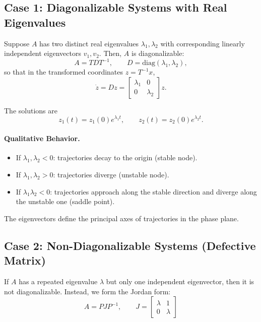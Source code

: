 \subsection{Case 1: Diagonalizable Systems with Real Eigenvalues}

Suppose $A$ has two distinct real eigenvalues $\lambda_1, \lambda_2$ with corresponding linearly independent eigenvectors $v_1, v_2$.  
Then, $A$ is diagonalizable:
\begin{equation}
\boxed{A = T D T^{-1}, \qquad D = \text{diag}(\lambda_1,\lambda_2),}
\end{equation}
so that in the transformed coordinates $z = T^{-1}x$,
\begin{equation}
\dot{z} = Dz =
\begin{bmatrix}
\lambda_1 & 0 \\
0 & \lambda_2
\end{bmatrix} z.
\end{equation}

The solutions are
\begin{equation}
z_1(t) = z_1(0)e^{\lambda_1 t}, \qquad z_2(t) = z_2(0)e^{\lambda_2 t}.
\end{equation}

\paragraph{Qualitative Behavior.}
\begin{itemize}
    \item If $\lambda_1, \lambda_2 < 0$: trajectories decay to the origin (stable node).
    \item If $\lambda_1, \lambda_2 > 0$: trajectories diverge (unstable node).
    \item If $\lambda_1 \lambda_2 < 0$: trajectories approach along the stable direction and diverge along the unstable one (saddle point).
\end{itemize}

The eigenvectors define the principal axes of trajectories in the phase plane.

\subsection{Case 2: Non-Diagonalizable Systems (Defective Matrix)}

If $A$ has a repeated eigenvalue $\lambda$ but only one independent eigenvector, then it is not diagonalizable.  
Instead, we form the Jordan form:
\begin{equation}
\boxed{
A = P J P^{-1}, \qquad J =
\begin{bmatrix}
\lambda & 1 \\
0 & \lambda
\end{bmatrix}}
\end{equation}

